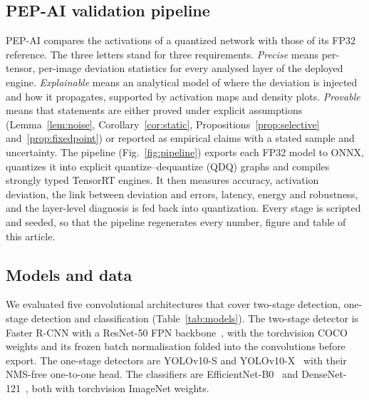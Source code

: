 \documentclass[pdflatex,sn-mathphys-num]{sn-jnl}%
\theoremstyle{thmstyleone}%
\theoremstyle{thmstyletwo}%
\theoremstyle{thmstylethree}%
\begin{document}
\subsection{PEP-AI validation pipeline}\label{sec:pipeline}

PEP-AI compares the activations of a quantized network with those of its FP32 reference. The three letters stand for three requirements. \emph{Precise} means per-tensor, per-image deviation statistics for every analysed layer of the deployed engine. \emph{Explainable} means an analytical model of where the deviation is injected and how it propagates, supported by activation maps and density plots. \emph{Provable} means that statements are either proved under explicit assumptions (Lemma~\ref{lem:noise}, Corollary~\ref{cor:static}, Propositions~\ref{prop:selective} and~\ref{prop:fixedpoint}) or reported as empirical claims with a stated sample and uncertainty. The pipeline (Fig.~\ref{fig:pipeline}) exports each FP32 model to ONNX, quantizes it into explicit quantize--dequantize (QDQ) graphs and compiles strongly typed TensorRT engines. It then measures accuracy, activation deviation, the link between deviation and errors, latency, energy and robustness, and the layer-level diagnosis is fed back into quantization. Every stage is scripted and seeded, so that the pipeline regenerates every number, figure and table of this article.

\subsection{Models and data}\label{sec:models}

We evaluated five convolutional architectures that cover two-stage detection, one-stage detection and classification (Table~\ref{tab:models}). The two-stage detector is Faster R-CNN with a ResNet-50 FPN backbone~\cite{ren2017faster}, with the torchvision COCO weights and its frozen batch normalisation folded into the convolutions before export. The one-stage detectors are YOLOv10-S and YOLOv10-X~\cite{wang2024yolov10} with their NMS-free one-to-one head. The classifiers are EfficientNet-B0~\cite{tan2019efficientnet} and DenseNet-121~\cite{huang2017densely}, both with torchvision ImageNet weights.
\end{document}
